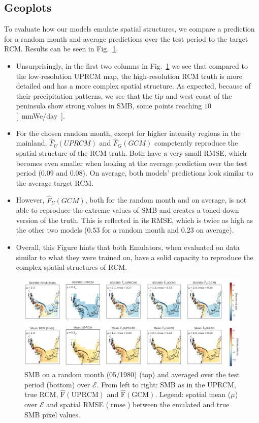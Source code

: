 \documentclass[a4paper,11pt,oneside]{report}
\begin{document}
\subsection{Geoplots}
To evaluate how our models emulate spatial structures, we compare a prediction for a random month and average predictions over the test period to the target RCM. Results can be seen in Fig.~\ref{fig:geoplots-GCM-RCM}. 
\begin{itemize}
    \item Unsurprisingly, in the first two columns in Fig.~\ref{fig:geoplots-GCM-RCM} we see that compared to the low-resolution UPRCM map, the high-resolution RCM truth is more detailed and has a more complex spatial structure. As expected, because of their precipitation patterns, we see that the tip and west coast of the peninsula show strong values in SMB, some points reaching $10$ \si{[mmWe/day]}. 
    \item For the chosen random month, except for higher intensity regions in the mainland, $\hat{F}_{U}(UPRCM)$ and $\hat{F}_{G}(GCM)$ competently reproduce the spatial structure of the RCM truth. Both have a very small RMSE, which becomes even smaller when looking at the average prediction over the test period ($0.09$ and $0.08$). On average, both models' predictions look similar to the average target RCM. 
    \item However, $\hat{F}_{U}(GCM)$, both for the random month and on average, is not able to reproduce the extreme values of SMB and creates a toned-down version of the truth. This is reflected in its RMSE, which is twice as high as the other two models ($0.53$ for a random month and $0.23$ on average). 
    \item Overall, this Figure hints that both Emulators, when evaluated on data similar to what they were trained on, have a solid capacity to reproduce the complex spatial structures of RCM. 
\end{itemize}

\begin{figure}[thb]
  \centering
  \includegraphics[width=\columnwidth]{doc/Thesis-latex/images/results/geoplots_RCM_GCM.pdf}
  \caption []{\small SMB on a random month (05/1980) (top) and averaged over the test period (bottom) over $\mathcal{E}$. From left to right: SMB as in the UPRCM, true RCM, $\operatorname{\hat{F}(UPRCM)}$ and $\operatorname{\hat{F}(GCM)}$. Legend: spatial mean ($\mu$) over $\mathcal{E}$ and spatial RMSE ($\operatorname{rmse}$) between the emulated and true SMB pixel values.}
  \vspace{-3mm}
  \label{fig:geoplots-GCM-RCM}
\end{figure}
\end{document}
